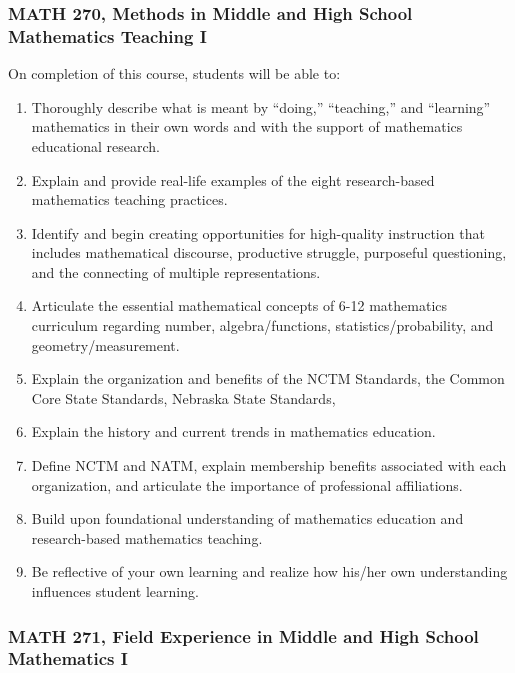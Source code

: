 \documentclass[11pt]{article}
\newenvironment{alphalist}{
  \begin{enumerate}[(1)]
    \addtolength{\itemsep}{-1.0\itemsep}}
  {\end{enumerate}}
\begin{document}
\subsubsection*{MATH 270, Methods in Middle and High School Mathematics Teaching I}

On completion of this course, students will be able to:
\begin{alphalist}

\item Thoroughly describe what is meant by “doing,”  “teaching,”  and “learning” mathematics in their own words and with the support of mathematics educational research.
\item Explain and provide real-life examples of the eight research-based mathematics teaching practices.
\item Identify and begin creating opportunities for high-quality instruction that includes mathematical discourse, productive struggle, purposeful questioning, and the connecting of multiple representations. 
\item Articulate the essential mathematical concepts of 6-12 mathematics curriculum regarding number, algebra/functions, statistics/probability, and geometry/measurement.
\item Explain the organization and benefits of the NCTM Standards, the Common Core State Standards, Nebraska State Standards, 
\item Explain the history and current trends in mathematics education.
\item Define NCTM and NATM, explain membership benefits associated with each organization, and articulate the importance of professional affiliations.
\item Build upon foundational understanding of mathematics education and research-based mathematics teaching.
\item Be reflective of your own learning and realize how his/her own understanding influences student learning.
\end{alphalist}

\subsubsection*{MATH 271, Field Experience in Middle and High School Mathematics I}
\end{document}

